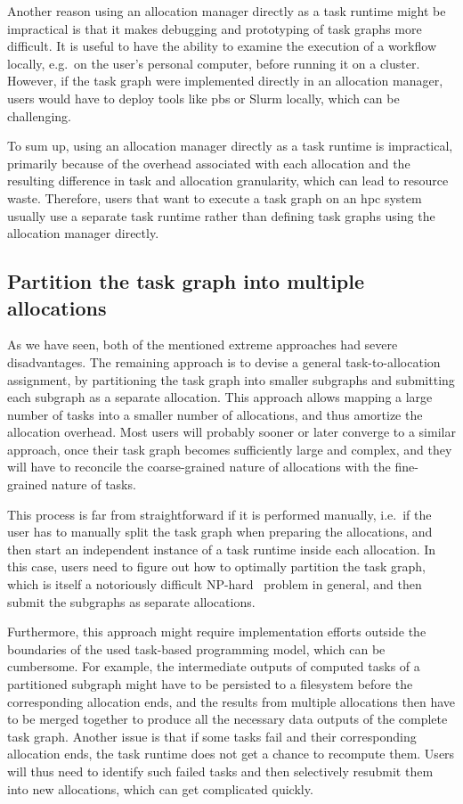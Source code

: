 Another reason using an allocation manager directly as a task runtime might be impractical is that
it makes debugging and prototyping of task graphs more difficult. It is useful to have the ability
to examine the execution of a workflow locally, e.g.\ on the user's personal computer, before
running it on a cluster. However, if the task graph were implemented directly in an allocation
manager, users would have to deploy tools like \gls{pbs} or Slurm locally, which
can be challenging.

To sum up, using an allocation manager directly as a task runtime is impractical, primarily because
of the overhead associated with each allocation and the resulting difference in task and allocation
granularity, which can lead to resource waste. Therefore, users that want to execute a task graph
on an \gls{hpc} system usually use a separate task runtime rather than defining
task graphs using the allocation manager directly.

\subsection*{Partition the task graph into multiple allocations}
As we have seen, both of the mentioned extreme approaches had severe disadvantages. The remaining
approach is to devise a general task-to-allocation assignment, by partitioning the task graph into
smaller subgraphs and submitting each subgraph as a separate allocation. This approach allows
mapping a large number of tasks into a smaller number of allocations, and thus amortize the
allocation overhead. Most users will probably sooner or later converge to a similar approach, once
their task graph becomes sufficiently large and complex, and they will have to reconcile the
coarse-grained nature of allocations with the fine-grained nature of tasks.

This process is far from straightforward if it is performed manually, i.e.\ if the user has to
manually split the task graph when preparing the allocations, and then start an independent
instance of a task runtime inside each allocation. In this case, users need to figure out how to
optimally partition the task graph, which is itself a notoriously difficult
NP-hard~\cite{graph_partitioning} problem in general, and then submit the subgraphs as separate
allocations.

Furthermore, this approach might require implementation efforts outside the boundaries of the used
task-based programming model, which can be cumbersome. For example, the intermediate outputs of
computed tasks of a partitioned subgraph might have to be persisted to a filesystem before the
corresponding allocation ends, and the results from multiple allocations then have to be merged
together to produce all the necessary data outputs of the complete task graph. Another issue is
that if some tasks fail and their corresponding allocation ends, the task runtime does not get a
chance to recompute them. Users will thus need to identify such failed tasks and then selectively
resubmit them into new allocations, which can get complicated quickly.


